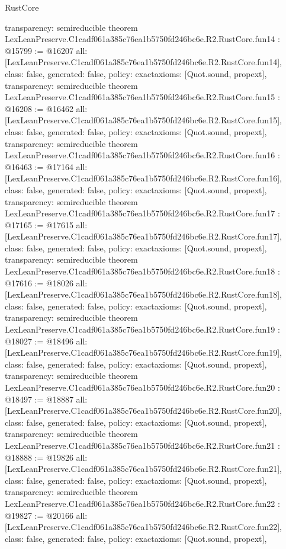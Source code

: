 \begin{lexlean}{RustCore}
\begin{coremodule}
{  transparency: semireducible
}
theorem LexLeanPreserve.C1cadf061a385c76ea1b5750fd246bc6e.R2.RustCore.fun14 : @15799 := @16207 {
  all: [LexLeanPreserve.C1cadf061a385c76ea1b5750fd246bc6e.R2.RustCore.fun14],
  class: false,
  generated: false,
  policy: exact{axioms: [Quot.sound, propext]},
  transparency: semireducible
}
theorem LexLeanPreserve.C1cadf061a385c76ea1b5750fd246bc6e.R2.RustCore.fun15 : @16208 := @16462 {
  all: [LexLeanPreserve.C1cadf061a385c76ea1b5750fd246bc6e.R2.RustCore.fun15],
  class: false,
  generated: false,
  policy: exact{axioms: [Quot.sound, propext]},
  transparency: semireducible
}
theorem LexLeanPreserve.C1cadf061a385c76ea1b5750fd246bc6e.R2.RustCore.fun16 : @16463 := @17164 {
  all: [LexLeanPreserve.C1cadf061a385c76ea1b5750fd246bc6e.R2.RustCore.fun16],
  class: false,
  generated: false,
  policy: exact{axioms: [Quot.sound, propext]},
  transparency: semireducible
}
theorem LexLeanPreserve.C1cadf061a385c76ea1b5750fd246bc6e.R2.RustCore.fun17 : @17165 := @17615 {
  all: [LexLeanPreserve.C1cadf061a385c76ea1b5750fd246bc6e.R2.RustCore.fun17],
  class: false,
  generated: false,
  policy: exact{axioms: [Quot.sound, propext]},
  transparency: semireducible
}
theorem LexLeanPreserve.C1cadf061a385c76ea1b5750fd246bc6e.R2.RustCore.fun18 : @17616 := @18026 {
  all: [LexLeanPreserve.C1cadf061a385c76ea1b5750fd246bc6e.R2.RustCore.fun18],
  class: false,
  generated: false,
  policy: exact{axioms: [Quot.sound, propext]},
  transparency: semireducible
}
theorem LexLeanPreserve.C1cadf061a385c76ea1b5750fd246bc6e.R2.RustCore.fun19 : @18027 := @18496 {
  all: [LexLeanPreserve.C1cadf061a385c76ea1b5750fd246bc6e.R2.RustCore.fun19],
  class: false,
  generated: false,
  policy: exact{axioms: [Quot.sound, propext]},
  transparency: semireducible
}
theorem LexLeanPreserve.C1cadf061a385c76ea1b5750fd246bc6e.R2.RustCore.fun20 : @18497 := @18887 {
  all: [LexLeanPreserve.C1cadf061a385c76ea1b5750fd246bc6e.R2.RustCore.fun20],
  class: false,
  generated: false,
  policy: exact{axioms: [Quot.sound, propext]},
  transparency: semireducible
}
theorem LexLeanPreserve.C1cadf061a385c76ea1b5750fd246bc6e.R2.RustCore.fun21 : @18888 := @19826 {
  all: [LexLeanPreserve.C1cadf061a385c76ea1b5750fd246bc6e.R2.RustCore.fun21],
  class: false,
  generated: false,
  policy: exact{axioms: [Quot.sound, propext]},
  transparency: semireducible
}
theorem LexLeanPreserve.C1cadf061a385c76ea1b5750fd246bc6e.R2.RustCore.fun22 : @19827 := @20166 {
  all: [LexLeanPreserve.C1cadf061a385c76ea1b5750fd246bc6e.R2.RustCore.fun22],
  class: false,
  generated: false,
  policy: exact{axioms: [Quot.sound, propext]},
}
\end{coremodule}
\end{lexlean}

